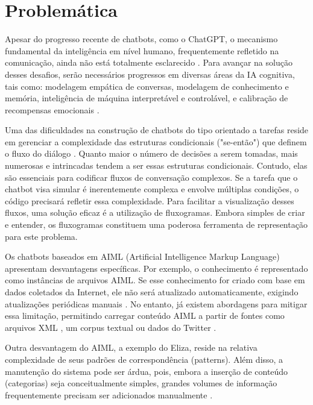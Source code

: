 \documentclass[14pt,a4paper,oneside]{book}
\begin{document}
\section{Problemática}	

Apesar do progresso recente de chatbots, como o ChatGPT, o mecanismo fundamental da inteligência em nível humano, frequentemente refletido na comunicação, ainda não está totalmente esclarecido \cite{Shum2018}. 
Para avançar na solução desses desafios, serão necessários progressos em diversas áreas da IA cognitiva, tais como: modelagem empática de conversas, modelagem de conhecimento e memória, inteligência de máquina interpretável e controlável, e calibração de recompensas emocionais \cite{Shum2018}.

Uma das dificuldades na construção de chatbots do tipo orientado a tarefas reside em gerenciar a complexidade das estruturas condicionais ("se-então") que definem o fluxo do diálogo \cite{Raj2019}. Quanto maior o número de decisões a serem tomadas, mais numerosas e intrincadas tendem a ser essas estruturas condicionais. Contudo, elas são essenciais para codificar fluxos de conversação complexos. 
Se a tarefa que o chatbot visa simular é inerentemente complexa e envolve múltiplas condições, o código precisará refletir essa complexidade. 
Para facilitar a visualização desses fluxos, uma solução eficaz é a utilização de fluxogramas.  %
Embora simples de criar e entender, os fluxogramas constituem uma poderosa ferramenta de representação para este problema.

Os chatbots baseados em AIML (Artificial Intelligence Markup Language) apresentam desvantagens específicas. Por exemplo, o conhecimento é representado como instâncias de arquivos AIML. Se esse conhecimento for criado com base em dados coletados da Internet, ele não será atualizado automaticamente, exigindo atualizações periódicas manuais \cite{Madhumitha2015}. No entanto, já existem abordagens para mitigar essa limitação, permitindo carregar conteúdo AIML a partir de fontes como arquivos XML \cite{Macedo2014}, um corpus textual \cite{DeGasperis2013} ou dados do Twitter \cite{Yamaguchi2018}.

Outra desvantagem do AIML, a exemplo do Eliza, reside na relativa complexidade de seus padrões de correspondência (patterns). Além disso, a manutenção do sistema pode ser árdua, pois, embora a inserção de conteúdo (categorias) seja conceitualmente simples, grandes volumes de informação frequentemente precisam ser adicionados manualmente \cite{Madhumitha2015}.
\end{document}
